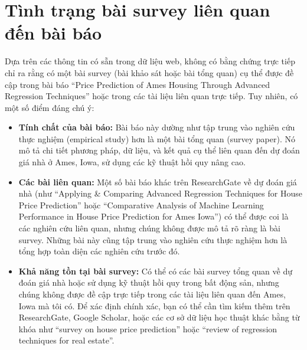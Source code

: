 

\section{Tình trạng bài survey liên quan đến bài báo}

Dựa trên các thông tin có sẵn trong dữ liệu web, không có bằng chứng trực tiếp chỉ ra rằng có một bài survey (bài khảo sát hoặc bài tổng quan) cụ thể được đề cập trong bài báo ``Price Prediction of Ames Housing Through Advanced Regression Techniques'' hoặc trong các tài liệu liên quan trực tiếp. Tuy nhiên, có một số điểm đáng chú ý:

\begin{itemize}[label=$\bullet$]
    \item \textbf{Tính chất của bài báo:} Bài báo này dường như tập trung vào nghiên cứu thực nghiệm (empirical study) hơn là một bài tổng quan (survey paper). Nó mô tả chi tiết phương pháp, dữ liệu, và kết quả cụ thể liên quan đến dự đoán giá nhà ở Ames, Iowa, sử dụng các kỹ thuật hồi quy nâng cao.
    \item \textbf{Các bài liên quan:} Một số bài báo khác trên ResearchGate về dự đoán giá nhà (như ``Applying \& Comparing Advanced Regression Techniques for House Price Prediction'' hoặc ``Comparative Analysis of Machine Learning Performance in House Price Prediction for Ames Iowa'') có thể được coi là các nghiên cứu liên quan, nhưng chúng không được mô tả rõ ràng là bài survey. Những bài này cũng tập trung vào nghiên cứu thực nghiệm hơn là tổng hợp toàn diện các nghiên cứu trước đó.
    \item \textbf{Khả năng tồn tại bài survey:} Có thể có các bài survey tổng quan về dự đoán giá nhà hoặc sử dụng kỹ thuật hồi quy trong bất động sản, nhưng chúng không được đề cập trực tiếp trong các tài liệu liên quan đến Ames, Iowa mà tôi có. Để xác định chính xác, bạn có thể cần tìm kiếm thêm trên ResearchGate, Google Scholar, hoặc các cơ sở dữ liệu học thuật khác bằng từ khóa như ``survey on house price prediction'' hoặc ``review of regression techniques for real estate''.
\end{itemize}

